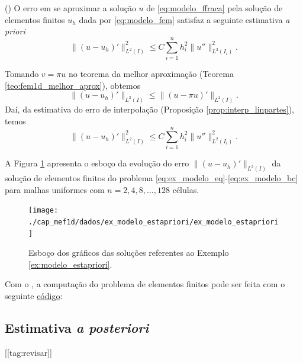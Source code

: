 \begin{teo}()
  O erro em se aproximar a solução $u$ de \eqref{eq:modelo_ffraca} pela solução de elementos finitos $u_h$ dada por \eqref{eq:modelo_fem} satisfaz a seguinte estimativa {\it a priori}
\begin{equation}
  \|(u-u_h)'\|_{L^2(I)}^2 \leq C\sum_{i=1}^n h_i^2\|u''\|_{L^2(I_i)}^2.
\end{equation}
\end{teo}
\begin{dem}
  Tomando $v = \pi u$ no teorema da melhor aproximação (Teorema \ref{teo:fem1d_melhor_aprox}), obtemos
  \begin{equation}
    \|(u-u_h)'\|_{L^2(I)} \leq \|(u-\pi u)'\|_{L^2(I)}.
  \end{equation}
Daí, da estimativa do erro de interpolação (Proposição \ref{prop:interp_linpartes}), temos
\begin{equation}
  \|(u-u_h)'\|_{L^2(I)}^2 \leq C\sum_{i=1}^n h_i^2\|u''\|_{L^2(I_i)}^2.
\end{equation}
\end{dem}

\begin{ex}\label{ex:modelo_estapriori}
  A Figura \ref{fig:ex_modelo_estapriori} apresenta o esboço da evolução do erro $\|(u - u_h)'\|_{L^2(I)}$ da solução de elementos finitos do problema \eqref{eq:ex_modelo_eq}-\eqref{eq:ex_modelo_bc} para malhas uniformes com $n=2, 4, 8, \ldots, 128$ células.

\begin{figure}[h!]
  \centering
  \texttt{[image: ./cap\_mef1d/dados/ex\_modelo\_estapriori/ex\_modelo\_estapriori]}
  \caption{Esboço dos gráficos das soluções referentes ao Exemplo \ref{ex:modelo_estapriori}.}
  \label{fig:ex_modelo_estapriori}
\end{figure}

\ifispython
Com o \fenics, a computação do problema de elementos finitos pode ser feita com o seguinte \href{https://github.com/phkonzen/notas/blob/master/src/MetodoElementosFinitos/cap_mef1d/dados/ex_modelo_estapriori/ex_modelo_estapriori.py}{código}:

\fi
\end{ex}

\subsection{Estimativa {\it a posteriori}}
[[tag:revisar]]

